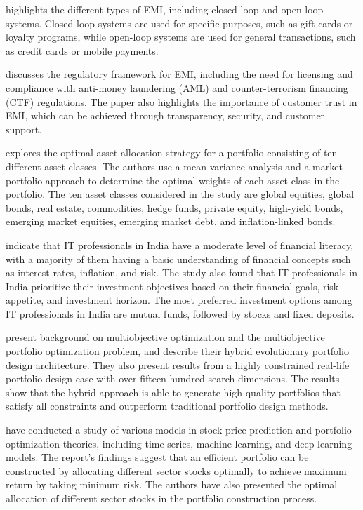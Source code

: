 \citep{patelpayment} highlights the different types of EMI, including closed-loop and open-loop systems. Closed-loop systems are used for specific purposes, such as gift cards or loyalty programs, while open-loop systems are used for general transactions, such as credit cards or mobile payments. 

\citep{patelpayment} discusses the regulatory framework for EMI, including the need for licensing and compliance with anti-money laundering (AML) and counter-terrorism financing (CTF) regulations. The paper also highlights the importance of customer trust in EMI, which can be achieved through transparency, security, and customer support. 

 explores the optimal asset allocation strategy for a portfolio consisting of ten different asset classes. The authors use a mean-variance analysis and a market portfolio approach to determine the optimal weights of each asset class in the portfolio. The ten asset classes considered in the study are global equities, global bonds, real estate, commodities, hedge funds, private equity, high-yield bonds, emerging market equities, emerging market debt, and inflation-linked bonds.

 indicate that IT professionals in India have a moderate level of financial literacy, with a majority of them having a basic understanding of financial concepts such as interest rates, inflation, and risk. The study also found that IT professionals in India prioritize their investment objectives based on their financial goals, risk appetite, and investment horizon. The most preferred investment options among IT professionals in India are mutual funds, followed by stocks and fixed deposits.

\citep{subbu2005multiobjective} present background on multiobjective optimization and the multiobjective portfolio optimization problem, and describe their hybrid evolutionary portfolio design architecture. They also present results from a highly constrained real-life portfolio design case with over fifteen hundred search dimensions. The results show that the hybrid approach is able to generate high-quality portfolios that satisfy all constraints and outperform traditional portfolio design methods. 

 have conducted a study of various models in stock price prediction and portfolio optimization theories, including time series, machine learning, and deep learning models. The report's findings suggest that an efficient portfolio can be constructed by allocating different sector stocks optimally to achieve maximum return by taking minimum risk. The authors have also presented the optimal allocation of different sector stocks in the portfolio construction process. 

